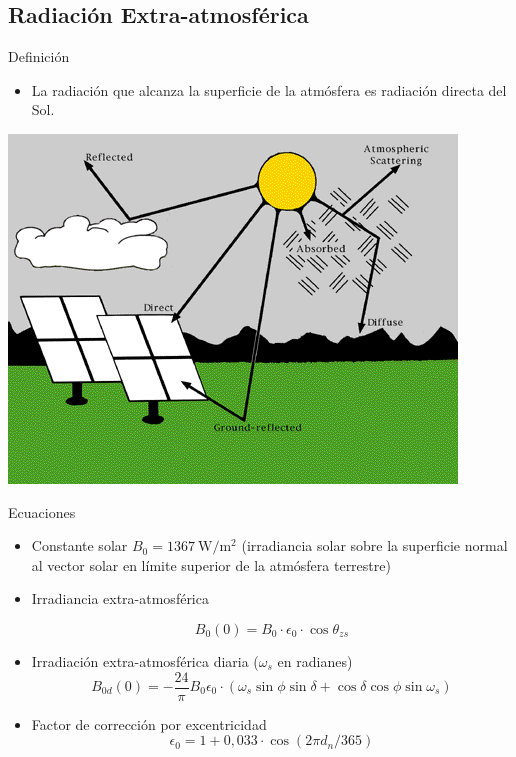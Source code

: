 \documentclass[xcolor={usenames,svgnames,dvipsnames}]{beamer}
\begin{document}
\subsection{Radiación Extra-atmosférica}
\label{sec:org45b060d}


\begin{frame}[label={sec:org1feebc2}]{Definición}
\begin{itemize}
\item La radiación que alcanza la superficie de la atmósfera es radiación
directa del Sol.
\end{itemize}

\begin{center}
\includegraphics[height=0.5\textheight]{../figs/SolarRadiationComponents_NREL.png}
\end{center}
\end{frame}


\begin{frame}[label={sec:orgd6cc47c}]{Ecuaciones}
\begin{itemize}
\item \alert{Constante solar} \(B_{0}=\SI{1367}{\watt\per\meter\squared}\)
(irradiancia solar sobre la superficie normal al vector solar en límite superior de la atmósfera terrestre)

\item \alert{Irradiancia extra-atmosférica}

\[B_{0}(0)=B_{0}\cdot\epsilon_{0}\cdot\cos\theta_{zs}\]

\item \alert{Irradiación extra-atmosférica diaria}  (\(\omega_{s}\) en radianes)
\[
  B_{0d}(0)=-\frac{24}{\pi}B_{0}\epsilon_{0}\cdot\left(\omega_{s}\sin\phi\sin\delta+\cos\delta\cos\phi\sin\omega_{s}\right)
\]

\item Factor de corrección por excentricidad
\[\epsilon_0 = 1+0,033\cdot\cos(2\pi d_n/365)\]
\end{itemize}
\end{frame}
\end{document}
